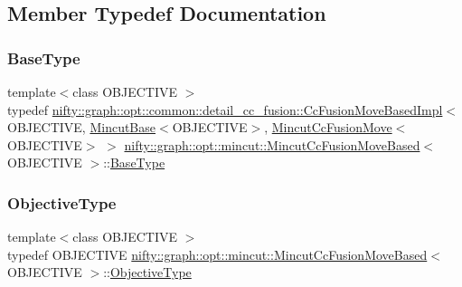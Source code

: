 \subsection{Member Typedef Documentation}
\mbox{\label{classnifty_1_1graph_1_1opt_1_1mincut_1_1MincutCcFusionMoveBased_a6f1a40c6dbc959fbdca5ff26e99913ba}} 
\subsubsection{\texorpdfstring{Base\+Type}{BaseType}}
{\footnotesize\ttfamily template$<$class O\+B\+J\+E\+C\+T\+I\+VE $>$ \\
typedef \hyperlink{classnifty_1_1graph_1_1opt_1_1common_1_1detail__cc__fusion_1_1CcFusionMoveBasedImpl}{nifty\+::graph\+::opt\+::common\+::detail\+\_\+cc\+\_\+fusion\+::\+Cc\+Fusion\+Move\+Based\+Impl}$<$ O\+B\+J\+E\+C\+T\+I\+VE, \hyperlink{classnifty_1_1graph_1_1opt_1_1mincut_1_1MincutBase}{Mincut\+Base}$<$O\+B\+J\+E\+C\+T\+I\+VE$>$, \hyperlink{classnifty_1_1graph_1_1opt_1_1mincut_1_1MincutCcFusionMove}{Mincut\+Cc\+Fusion\+Move}$<$O\+B\+J\+E\+C\+T\+I\+VE$>$ $>$ \hyperlink{classnifty_1_1graph_1_1opt_1_1mincut_1_1MincutCcFusionMoveBased}{nifty\+::graph\+::opt\+::mincut\+::\+Mincut\+Cc\+Fusion\+Move\+Based}$<$ O\+B\+J\+E\+C\+T\+I\+VE $>$\+::\hyperlink{classnifty_1_1graph_1_1opt_1_1mincut_1_1MincutCcFusionMoveBased_a6f1a40c6dbc959fbdca5ff26e99913ba}{Base\+Type}}

\mbox{\label{classnifty_1_1graph_1_1opt_1_1mincut_1_1MincutCcFusionMoveBased_a59dd78b1fd2c3ed4f4b969e1d791ae0f}} 
\subsubsection{\texorpdfstring{Objective\+Type}{ObjectiveType}}
{\footnotesize\ttfamily template$<$class O\+B\+J\+E\+C\+T\+I\+VE $>$ \\
typedef O\+B\+J\+E\+C\+T\+I\+VE \hyperlink{classnifty_1_1graph_1_1opt_1_1mincut_1_1MincutCcFusionMoveBased}{nifty\+::graph\+::opt\+::mincut\+::\+Mincut\+Cc\+Fusion\+Move\+Based}$<$ O\+B\+J\+E\+C\+T\+I\+VE $>$\+::\hyperlink{classnifty_1_1graph_1_1opt_1_1mincut_1_1MincutCcFusionMoveBased_a59dd78b1fd2c3ed4f4b969e1d791ae0f}{Objective\+Type}}

